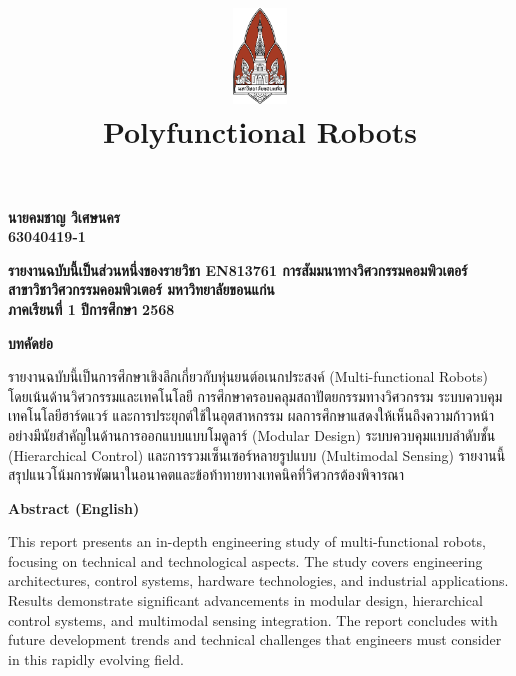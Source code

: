 \documentclass[a4paper]{article}
\date{}
\author{}
\title{
    \includegraphics[width=1in, height=1in, keepaspectratio]{logo.png}
    \\[2ex]
    {\fontsize{32pt}{36pt}\selectfont\textbf{Polyfunctional Robots}}
}
\newcommand{\thaipage}[1]{%
  \ifcase#1\or ก\or ข\or ค\or ง\or จ\or ฉ\or ช\or ซ\or ฌ\or ญ\or
  ฎ\or ฏ\or ฐ\or ฑ\or ฒ\or ณ\or ด\or ต\or ถ\or ท\or ธ\or น\or บ\or ป\or ผ\or ฝ\or พ\or ฟ\or ภ\or ม\or
  ย\or ร\or ล\or ว\or ศ\or ษ\or ส\or ห\or ฬ\or อ\or ฮ\else\arabic{#1}\fi
}
\begin{document}
\maketitle
\thispagestyle{empty}

\vfill
\begin{center}
    {\fontsize{22pt}{26pt}\selectfont\textbf{
        นายคมชาญ วิเศษนคร
        \\ 63040419-1
    }}
\end{center}
\vfill

\vfill
\begin{center}
    {\fontsize{16pt}{20pt}\selectfont\textbf{
        รายงานฉบับนี้เป็นส่วนหนึ่งของรายวิชา EN813761 การสัมมนาทางวิศวกรรมคอมพิวเตอร์
        \\ สาขาวิชาวิศวกรรมคอมพิวเตอร์ มหาวิทยาลัยขอนแก่น
        \\ ภาคเรียนที่ 1 ปีการศึกษา 2568
    }}
\end{center}

\newpage
\setcounter{page}{1}
\renewcommand{\thepage}{\thaipage{\value{page}}}
\pagestyle{plain}

\setcounter{page}{1}
\pagestyle{plain}

\noindent
{\centering
    {\fontsize{18pt}{22pt}\selectfont\textbf{บทคัดย่อ}\par}
}

รายงานฉบับนี้เป็นการศึกษาเชิงลึกเกี่ยวกับหุ่นยนต์อเนกประสงค์ (Multi-functional Robots) โดยเน้นด้านวิศวกรรมและเทคโนโลยี การศึกษาครอบคลุมสถาปัตยกรรมทางวิศวกรรม ระบบควบคุม เทคโนโลยีฮาร์ดแวร์ และการประยุกต์ใช้ในอุตสาหกรรม ผลการศึกษาแสดงให้เห็นถึงความก้าวหน้าอย่างมีนัยสำคัญในด้านการออกแบบแบบโมดูลาร์ (Modular Design) ระบบควบคุมแบบลำดับชั้น (Hierarchical Control) และการรวมเซ็นเซอร์หลายรูปแบบ (Multimodal Sensing) รายงานนี้สรุปแนวโน้มการพัฒนาในอนาคตและข้อท้าทายทางเทคนิคที่วิศวกรต้องพิจารณา

\vspace{1em}

\noindent
{\centering
    {\fontsize{18pt}{22pt}\selectfont\textbf{Abstract (English)}\par}
}

This report presents an in-depth engineering study of multi-functional robots, focusing on technical and technological aspects. The study covers engineering architectures, control systems, hardware technologies, and industrial applications. Results demonstrate significant advancements in modular design, hierarchical control systems, and multimodal sensing integration. The report concludes with future development trends and technical challenges that engineers must consider in this rapidly evolving field.
\end{document}
